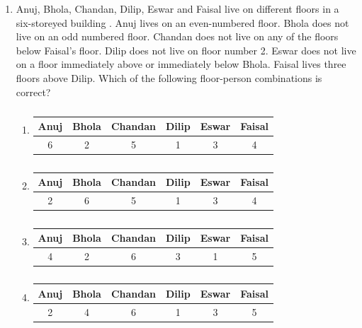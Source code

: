 \documentclass[a4paper,10pt]{article}
\begin{document}
\begin{enumerate}
    \item Anuj, Bhola, Chandan, Dilip, Eswar and Faisal live on different floors in a six-storeyed building . Anuj lives on an even-numbered floor. Bhola does not live on an odd numbered floor. Chandan does not live on any of the floors below Faisal's floor. Dilip does not live on floor number 2. Eswar does not live on a floor immediately above or immediately below Bhola. Faisal lives three floors above Dilip. Which of the following floor-person combinations is correct?
    
    \hfill{}
    \begin{enumerate}[label=\Alph*)]
        \item 
        \begin{table}[H] \centering \caption*{} \label{tab:q7ga_a} \begin{tabular}{|c|c|c|c|c|c|} \hline Anuj & Bhola & Chandan & Dilip & Eswar & Faisal \\ \hline 6 & 2 & 5 & 1 & 3 & 4 \\ \hline \end{tabular} \end{table}
        \item 
        \begin{table}[H] \centering \caption*{} \label{tab:q7ga_b} \begin{tabular}{|c|c|c|c|c|c|} \hline Anuj & Bhola & Chandan & Dilip & Eswar & Faisal \\ \hline 2 & 6 & 5 & 1 & 3 & 4 \\ \hline \end{tabular} \end{table}
        \item 
        \begin{table}[H] \centering \caption*{} \label{tab:q7ga_c} \begin{tabular}{|c|c|c|c|c|c|} \hline Anuj & Bhola & Chandan & Dilip & Eswar & Faisal \\ \hline 4 & 2 & 6 & 3 & 1 & 5 \\ \hline \end{tabular} \end{table}
        \item 
        \begin{table}[H] \centering \caption*{} \label{tab:q7ga_d} \begin{tabular}{|c|c|c|c|c|c|} \hline Anuj & Bhola & Chandan & Dilip & Eswar & Faisal \\ \hline 2 & 4 & 6 & 1 & 3 & 5 \\ \hline \end{tabular} \end{table}
    \end{enumerate}
    

\end{enumerate}
\end{document}
